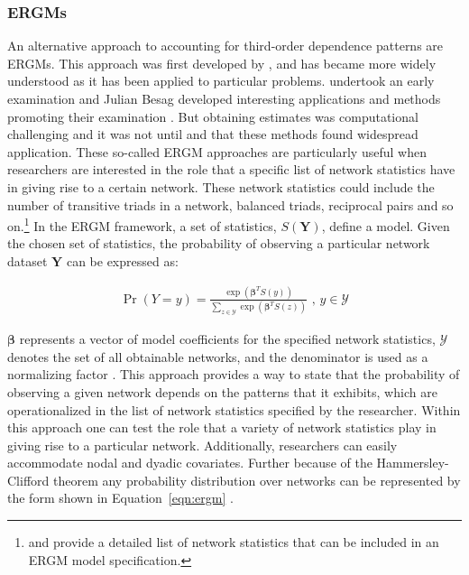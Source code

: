 \documentclass[12pt,pdflatex]{elsarticle}
\begin{document}
\subsubsection{\textbf{ERGMs}}

An alternative approach to accounting for third-order dependence patterns are ERGMs. This approach was first developed by \citet{erdos:renyi:1959}, and has became more widely understood as it has been applied to particular problems. \citet{frank:1971} undertook an early examination and Julian Besag developed interesting applications and methods promoting their examination \citep{besag:1977b}. But obtaining estimates was computational challenging and it was not until \citet{frank:strauss:1986} and \citet{wasserman:pattison:1996} that these methods found widespread application. These so-called ERGM approaches are particularly useful when researchers are interested in the role that a specific list of network statistics have in giving rise to a certain network. These network statistics could include the number of transitive triads in a network, balanced triads, reciprocal pairs and so on.\footnote{\citet{morris:etal:2008} and \citet{snijders:etal:2006} provide a detailed list of network statistics that can be included in an ERGM model specification.} In the ERGM framework, a set of statistics, $S(\mathbf{Y})$, define a model. Given the chosen set of statistics, the probability of observing a particular network dataset $\mathbf{Y}$ can be expressed as:

\begin{align}
\Pr(Y = y) = \frac{ \exp( \bm\beta^{T} S(y)  )  }{ \sum_{z \in \mathcal{Y}} \exp( \bm\beta^{T} S(z)  )  } \text{ ,  } y \in \mathcal{Y}
\label{eqn:ergm}
\end{align}

$\bm\beta$ represents a vector of model coefficients for the specified network statistics, $\mathcal{Y}$ denotes the set of all obtainable networks, and the denominator is used as a normalizing factor \citep{hunter:etal:2008}. This approach provides a way to state that the probability of observing a given network depends on the patterns that it exhibits, which are operationalized in the list of network statistics specified by the researcher. Within this approach one can test the role that a variety of network statistics play in giving rise to a particular network. Additionally, researchers can easily accommodate nodal and dyadic covariates. Further because of the Hammersley-Clifford theorem any probability distribution over networks can be represented by the form shown in Equation~\ref{eqn:ergm} \citep{hammersley:clifford:1971}. 
\end{document}
